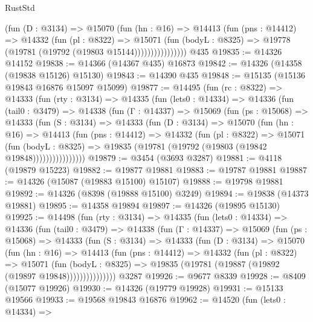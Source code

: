 \begin{lexlean}{RustStd}
\begin{coremodule}
                    (fun (D : @3134) =>
                    @15070
                      (fun (hn : @16) =>
                      @14413
                        (fun (pns : @14412) =>
                        @14332
                          (fun (pl : @8322) =>
                          @15071
                            (fun (bodyL : @8325) =>
                            @19778 (@19781 (@19792 (@19803 @15144))))))))))))))))
    @435
@19835 := @14326 @14152
@19838 := @14366 (@14367 @435) @16873
@19842 := @14326 (@14358 (@19838 @15126) @15130)
@19843 := @14390 @435
@19848 := @15135 (@15136 @19843 @16876 @15097 @15099)
@19877 := @14495
    (fun (rc : @8322) =>
    @14333
      (fun (rty : @3134) =>
      @14335
        (fun (lets0 : @14334) =>
        @14336
          (fun (tail0 : @3479) =>
          @14338
            (fun (Γ : @14337) =>
            @15069
              (fun (ps : @15068) =>
              @14333
                (fun (S : @3134) =>
                @14333
                  (fun (D : @3134) =>
                  @15070
                    (fun (hn : @16) =>
                    @14413
                      (fun (pns : @14412) =>
                      @14332
                        (fun (pl : @8322) =>
                        @15071
                          (fun (bodyL : @8325) =>
                          @19835 (@19781 (@19792 (@19803 (@19842 @19848))))))))))))))))
@19879 := @3454 (@3693 @3287)
@19881 := @4118 (@19879 @15223)
@19882 := @19877 @19881
@19883 := @19787 @19881
@19887 := @14326 (@15087 (@19883 @15100) @15107)
@19888 := @19798 @19881
@19892 := @14326 (@8398 (@19888 @15100) @3249)
@19894 := @19838 (@14373 @19881)
@19895 := @14358 @19894
@19897 := @14326 (@19895 @15130)
@19925 := @14498
    (fun (rty : @3134) =>
    @14335
      (fun (lets0 : @14334) =>
      @14336
        (fun (tail0 : @3479) =>
        @14338
          (fun (Γ : @14337) =>
          @15069
            (fun (ps : @15068) =>
            @14333
              (fun (S : @3134) =>
              @14333
                (fun (D : @3134) =>
                @15070
                  (fun (hn : @16) =>
                  @14413
                    (fun (pns : @14412) =>
                    @14332
                      (fun (pl : @8322) =>
                      @15071
                        (fun (bodyL : @8325) =>
                        @19835 (@19781 (@19887 (@19892 (@19897 @19848)))))))))))))))
    @3287
@19926 := @9677 @8339
@19928 := @8409 (@15077 @19926)
@19930 := @14326 (@19779 @19928)
@19931 := @15133 @19566
@19933 := @19568 @19843 @16876
@19962 := @14520
    (fun (lets0 : @14334) =>

\end{coremodule}
\end{lexlean}
